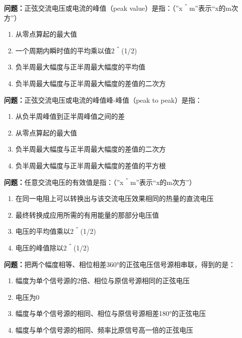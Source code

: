 \bigskip


\noindent\textbf{问题：}正弦交流电压或电流的峰值（peak value）是指：（”x＾m”表示“x的m次方”）
\begin{enumerate}[label=\Alph*), leftmargin=3em]
\item 从零点算起的最大值
\item 一个周期内瞬时值的平均乘以值2＾(1/2)
\item 负半周最大幅度与正半周最大幅度的平均值
\item 负半周最大幅度与正半周最大幅度的差值的二次方
\end{enumerate}

\bigskip


\noindent\textbf{问题：}正弦交流电压或电流的峰值峰-峰值（peak to peak）是指：
\begin{enumerate}[label=\Alph*), leftmargin=3em]
\item 从负半周峰值到正半周峰值之间的差
\item 从零点算起的最大值
\item 负半周最大幅度与正半周最大幅度的差值的二次方
\item 负半周最大幅度与正半周最大幅度的差值的平方根
\end{enumerate}

\bigskip


\noindent\textbf{问题：}任意交流电压的有效值是指：（”x＾m”表示“x的m次方”）
\begin{enumerate}[label=\Alph*), leftmargin=3em]
\item 在同一电阻上可以转换出与该交流电压效果相同的热量的直流电压
\item 最终转换成应用所需的有用能量的那部分电压值
\item 电压的平均值乘以2＾(1/2)
\item 电压的峰值除以2＾(1/2)
\end{enumerate}

\bigskip


\noindent\textbf{问题：}把两个幅度相等、相位相差360°的正弦电压信号源相串联，得到的是：
\begin{enumerate}[label=\Alph*), leftmargin=3em]
\item 幅度为单个信号源的2倍、相位与原信号源相同的正弦电压
\item 电压为0
\item 幅度与单个信号源的相同、相位与原信号源相差180°的正弦电压
\item 幅度与单个信号源的相同、频率比原信号高一倍的正弦电压
\end{enumerate}


